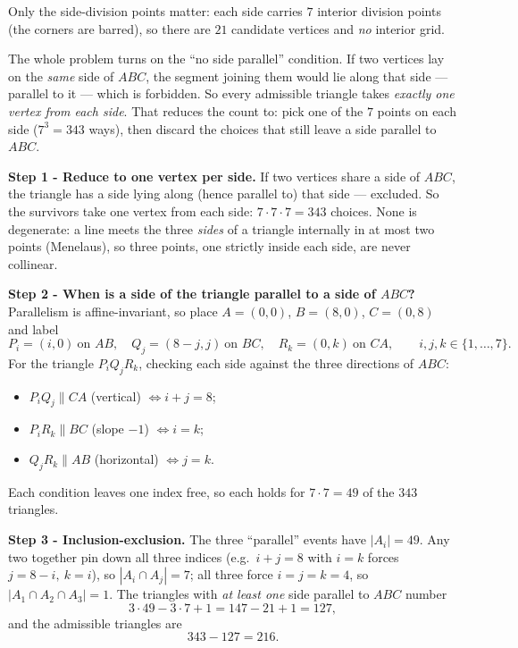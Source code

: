 \documentclass[11pt,a4paper]{article}
\begin{document}
\begin{ideabox}
Only the side-division points matter: each side carries $7$ interior division points (the corners
are barred), so there are $21$ candidate vertices and \emph{no} interior grid.

The whole problem turns on the ``no side parallel'' condition. If two vertices lay on the
\emph{same} side of $ABC$, the segment joining them would lie along that side --- parallel to it ---
which is forbidden. So every admissible triangle takes \emph{exactly one vertex from each side}.
That reduces the count to: pick one of the $7$ points on each side ($7^3=343$ ways), then discard
the choices that still leave a side parallel to $ABC$.
\end{ideabox}

\textbf{Step 1 - Reduce to one vertex per side.}
If two vertices share a side of $ABC$, the triangle has a side lying along (hence parallel to) that
side --- excluded. So the survivors take one vertex from each side: $7\cdot 7\cdot 7=343$ choices.
None is degenerate: a line meets the three \emph{sides} of a triangle internally in at most two
points (Menelaus), so three points, one strictly inside each side, are never collinear.

\textbf{Step 2 - When is a side of the triangle parallel to a side of $ABC$?}
Parallelism is affine-invariant, so place $A=(0,0)$, $B=(8,0)$, $C=(0,8)$ and label
$$P_i=(i,0)\ \text{on }AB,\quad Q_j=(8-j,j)\ \text{on }BC,\quad R_k=(0,k)\ \text{on }CA,\qquad i,j,k\in\{1,\dots,7\}.$$
For the triangle $P_iQ_jR_k$, checking each side against the three directions of $ABC$:
\begin{itemize}[nosep]
  \item $P_iQ_j \parallel CA$ (vertical) $\iff i+j=8$;
  \item $P_iR_k \parallel BC$ (slope $-1$) $\iff i=k$;
  \item $Q_jR_k \parallel AB$ (horizontal) $\iff j=k$.
\end{itemize}
Each condition leaves one index free, so each holds for $7\cdot 7=49$ of the $343$ triangles.

\textbf{Step 3 - Inclusion-exclusion.}
The three ``parallel'' events have $|A_i|=49$. Any two together pin down all three indices
(e.g.\ $i+j=8$ with $i=k$ forces $j=8-i,\ k=i$), so $|A_i\cap A_j|=7$; all three force $i=j=k=4$, so
$|A_1\cap A_2\cap A_3|=1$. The triangles with \emph{at least one} side parallel to $ABC$ number
$$3\cdot 49-3\cdot 7+1=147-21+1=127,$$
and the admissible triangles are
$$343-127=216.$$
\end{document}
